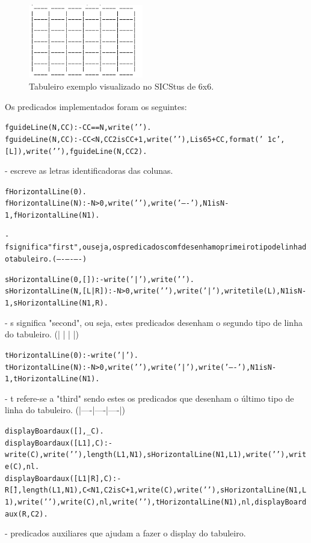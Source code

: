 \documentclass[a4paper]{article}
\begin{document}
\begin{figure}[h!]
\centering
\includegraphics[width=50mm]{board.jpg}
\caption{Tabuleiro exemplo visualizado no SICStus de 6x6. \label{board}}
\end{figure}

Os predicados implementados foram os seguintes:

\begin{alltt}
	fguideLine(N, CC) :- CC==N, write('    ').
	fguideLine(N, CC) :- CC < N, CC2 is CC+1, write('    '), \newline L is 65+CC, format('~1c', [L]) , write(' '), fguideLine(N, CC2).
\end{alltt}
		\normalfont - escreve as letras identificadoras das colunas.
\begin{alltt}
	fHorizontalLine(0).
	fHorizontalLine(N) :- N>0 , write('  '), write('----'), \newline N1 is N-1 , fHorizontalLine(N1).

		 \normalfont - f significa "first", ou seja, os predicados com f desenham o primeiro tipo de linha do tabuleiro. ( ---- ---- ----)
\end{alltt}
\begin{alltt}
	sHorizontalLine(0, []) :- write('|'),write(' ').
	sHorizontalLine(N, [L|R]) :- N>0, write(' '),  write('|'), \newline writetile(L), N1 is N-1, sHorizontalLine(N1, R).
\end{alltt}
		\normalfont  - s significa "second", ou seja, estes predicados desenham o segundo tipo de linha do tabuleiro. (|    |    |    |)
\begin{alltt}
	tHorizontalLine(0) :-  write('|').
	tHorizontalLine(N) :- N>0, write(' '), write('|'), write('----'), \newline N1 is N-1 , tHorizontalLine(N1).
\end{alltt}
		\normalfont - t refere-se a "third" sendo estes os predicados que desenham o último tipo de linha do tabuleiro. (|----|----|----|)

\begin{alltt}
	displayBoardaux([], _C).
	displayBoardaux([L1], C) :-  write(C) ,write(' '), length(L1,N1), \newline sHorizontalLine(N1,L1), write(' '), write(C), nl.
	displayBoardaux([L1|R], C) :- R \= [], length(L1,N1), C < N1, C2 is C+1, \newline write(C), write(' '), sHorizontalLine(N1, L1), write(' '), \newline write(C), nl, write('  '), tHorizontalLine(N1), nl, displayBoardaux(R, C2).
\end{alltt}
		\normalfont - predicados auxiliares que ajudam a fazer o display do tabuleiro.
\end{document}
